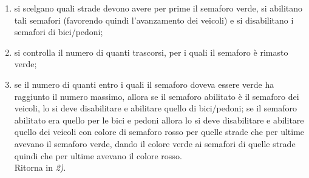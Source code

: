 \begin{enumerate}
\item si scelgano quali strade devono avere per prime il semaforo verde, si 
abilitano tali semafori (favorendo quindi l'avanzamento dei veicoli) e si
disabilitano i semafori di bici/pedoni;
\item si controlla il numero di quanti trascorsi, per i quali il semaforo è
rimasto verde;
\item se il numero di quanti entro i quali il semaforo doveva essere verde ha
raggiunto il numero massimo, allora se il semaforo abilitato è il semaforo dei
veicoli, lo si deve disabilitare e abilitare quello di bici/pedoni; se il
semaforo abilitato era quello per le bici e pedoni allora lo si deve
disabilitare e abilitare quello dei veicoli con colore di semaforo rosso per
quelle strade che per ultime avevano il semaforo verde, dando il colore verde
ai semafori di quelle strade quindi che per ultime avevano il colore rosso.\\
Ritorna in \textit{2)}.
\end{enumerate}
 